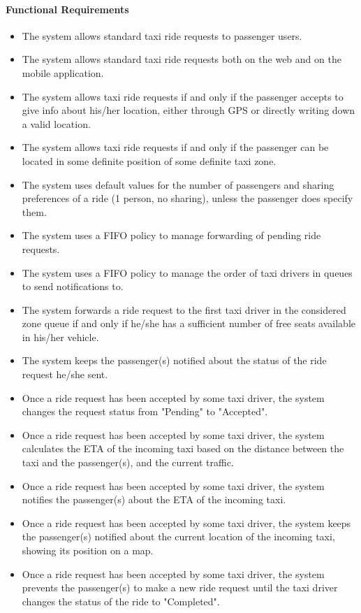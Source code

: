 	\paragraph{Functional Requirements}
		\begin{itemize}
			\item The system allows standard taxi ride requests to passenger users.
			\item The system allows standard taxi ride requests both on the web and on the mobile application.
			\item The system allows taxi ride requests if and only if the passenger accepts to give info about his/her location, either through GPS or directly writing down a valid location.
			\item The system allows taxi ride requests if and only if the passenger can be located in some definite position of some definite taxi zone.
			\item The system uses default values for the number of passengers and sharing preferences of a ride (1 person, no sharing), unless the passenger does specify them.
			\item The system uses a FIFO policy to manage forwarding of pending ride requests.
			\item The system uses a FIFO policy to manage the order of taxi drivers in queues to send notifications to.
			\item The system forwards a ride request to the first taxi driver in the considered zone queue if and only if he/she has a sufficient number of free seats available in his/her vehicle.
			\item The system keeps the passenger(s) notified about the status of the ride request he/she sent.
			\item Once a ride request has been accepted by some taxi driver, the system changes the request status from "Pending" to "Accepted".
			\item Once a ride request has been accepted by some taxi driver, the system calculates the ETA of the incoming taxi based on the distance between the taxi and the passenger(s), and the current traffic.
			\item Once a ride request has been accepted by some taxi driver, the system notifies the passenger(s) about the ETA of the incoming taxi.
			\item Once a ride request has been accepted by some taxi driver, the system keeps the passenger(s) notified about the current location of the incoming taxi, showing its position on a map.
			\item Once a ride request has been accepted by some taxi driver, the system prevents the passenger(s) to make a new ride request until the taxi driver changes the status of the ride to "Completed".
		\end{itemize}
		
